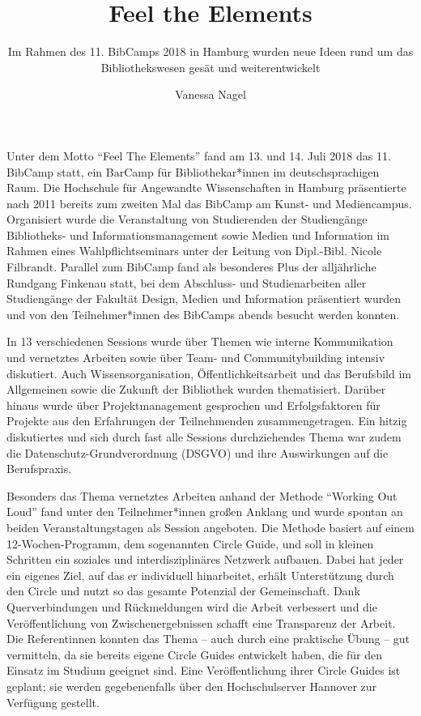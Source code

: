 \documentclass[a4paper,
fontsize=11pt,
oneside,
numbers=noperiodatend,
parskip=half-,
bibliography=totoc,
final
]{scrartcl}
\title{\LARGE{Feel the Elements}}%
\subtitle{Im Rahmen des 11. BibCamps 2018 in Hamburg wurden neue Ideen rund um das
Bibliothekswesen gesät und weiterentwickelt}
\author{Vanessa Nagel} %
\date{}
\begin{document}
\maketitle
\thispagestyle{fancyplain} 


Unter dem Motto \enquote{Feel The Elements} fand am 13. und 14. Juli
2018 das 11. BibCamp statt, ein BarCamp für Bibliothekar*innen im
deutschsprachigen Raum. Die Hochschule für Angewandte Wissenschaften in
Hamburg präsentierte nach 2011 bereits zum zweiten Mal das BibCamp am
Kunst- und Mediencampus. Organisiert wurde die Veranstaltung von
Studierenden der Studiengänge Bibliotheks- und Informationsmanagement
sowie Medien und Information im Rahmen eines Wahlpflichtseminars unter
der Leitung von Dipl.-Bibl. Nicole Filbrandt. Parallel zum BibCamp fand
als besonderes Plus der alljährliche Rundgang Finkenau statt, bei dem
Abschluss- und Studienarbeiten aller Studiengänge der Fakultät Design,
Medien und Information präsentiert wurden und von den Teilnehmer*innen
des BibCamps abends besucht werden konnten.

In 13 verschiedenen Sessions wurde über Themen wie interne Kommunikation
und vernetztes Arbeiten sowie über Team- und Communitybuilding intensiv
diskutiert. Auch Wissensorganisation, Öffentlichkeitsarbeit und das
Berufsbild im Allgemeinen sowie die Zukunft der Bibliothek wurden
thematisiert. Darüber hinaus wurde über Projektmanagement gesprochen und
Erfolgsfaktoren für Projekte aus den Erfahrungen der Teilnehmenden
zusammengetragen. Ein hitzig diskutiertes und sich durch fast alle
Sessions durchziehendes Thema war zudem die Datenschutz-Grundverordnung
(DSGVO) und ihre Auswirkungen auf die Berufspraxis.

Besonders das Thema vernetztes Arbeiten anhand der Methode
\enquote{Working Out Loud} fand unter den Teilnehmer*innen großen
Anklang und wurde spontan an beiden Veranstaltungstagen als Session
angeboten. Die Methode basiert auf einem 12-Wochen-Programm, dem
sogenannten Circle Guide, und soll in kleinen Schritten ein soziales und
interdisziplinäres Netzwerk aufbauen. Dabei hat jeder ein eigenes Ziel,
auf das er individuell hinarbeitet, erhält Unterstützung durch den
Circle und nutzt so das gesamte Potenzial der Gemeinschaft. Dank
Querverbindungen und Rückmeldungen wird die Arbeit verbessert und die
Veröffentlichung von Zwischenergebnissen schafft eine Transparenz der
Arbeit. Die Referentinnen konnten das Thema -- auch durch eine
praktische Übung -- gut vermitteln, da sie bereits eigene Circle Guides
entwickelt haben, die für den Einsatz im Studium geeignet sind. Eine
Veröffentlichung ihrer Circle Guides ist geplant; sie werden
gegebenenfalls über den Hochschulserver Hannover zur Verfügung gestellt.
\end{document}
